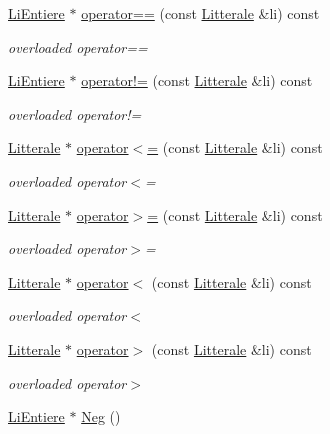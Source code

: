 \begin{DoxyCompactItemize}
\hyperlink{class_li_entiere}{Li\+Entiere} $\ast$ \hyperlink{class_li_entiere_a27b8284b91bca5d9113676b7e9fd04d2}{operator==} (const \hyperlink{class_litterale}{Litterale} \&li) const 
\begin{DoxyCompactList}\small\item\em overloaded operator== \end{DoxyCompactList}\item 
\hyperlink{class_li_entiere}{Li\+Entiere} $\ast$ \hyperlink{class_li_entiere_af14a5d2ad57e93da2176d4316e5e2330}{operator!=} (const \hyperlink{class_litterale}{Litterale} \&li) const 
\begin{DoxyCompactList}\small\item\em overloaded operator!= \end{DoxyCompactList}\item 
\hyperlink{class_litterale}{Litterale} $\ast$ \hyperlink{class_li_entiere_a90a3b7b2f1ef1ea18faa50cd7150f141}{operator$<$=} (const \hyperlink{class_litterale}{Litterale} \&li) const 
\begin{DoxyCompactList}\small\item\em overloaded operator$<$= \end{DoxyCompactList}\item 
\hyperlink{class_litterale}{Litterale} $\ast$ \hyperlink{class_li_entiere_af4494bc2dda7b1ff2301b43f19dbc197}{operator$>$=} (const \hyperlink{class_litterale}{Litterale} \&li) const 
\begin{DoxyCompactList}\small\item\em overloaded operator$>$= \end{DoxyCompactList}\item 
\hyperlink{class_litterale}{Litterale} $\ast$ \hyperlink{class_li_entiere_a6446d0a2f619c160cf6a802c531d7d26}{operator$<$} (const \hyperlink{class_litterale}{Litterale} \&li) const 
\begin{DoxyCompactList}\small\item\em overloaded operator$<$ \end{DoxyCompactList}\item 
\hyperlink{class_litterale}{Litterale} $\ast$ \hyperlink{class_li_entiere_a92f1f5e097a794670463127a638a2f7b}{operator$>$} (const \hyperlink{class_litterale}{Litterale} \&li) const 
\begin{DoxyCompactList}\small\item\em overloaded operator$>$ \end{DoxyCompactList}\item 
\hyperlink{class_li_entiere}{Li\+Entiere} $\ast$ \hyperlink{class_li_entiere_a708a535d92593c881c749f70bbdfacde}{Neg} ()

\end{DoxyCompactItemize}
